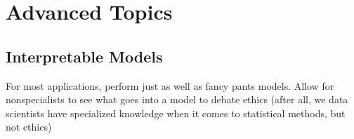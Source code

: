 \documentclass[letterpaper,10pt,english]{jupyterBook}
\begin{document}
\sphinxstepscope


\part{Advanced Topics}

\sphinxstepscope


\chapter{Interpretable Models}
\label{\detokenize{40_advanced_topics/30_interpretability:interpretable-models}}\label{\detokenize{40_advanced_topics/30_interpretability::doc}}
\sphinxAtStartPar
For most applications, perform just as well as fancy pants models. 
Allow for non\sphinxhyphen{}specialists to see what goes into a model to debate ethics (after all, we data scientists have specialized knowledge when it comes to statistical methods, but not ethics)







\renewcommand{\indexname}{Index}
\printindex
\end{document}
